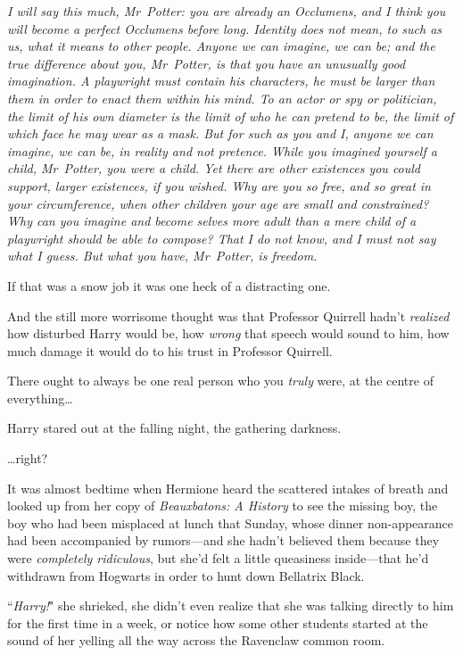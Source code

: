 \emph{I will say this much, Mr~Potter: you are already an Occlumens, and I think you will become a perfect Occlumens before long. Identity does not mean, to such as us, what it means to other people. Anyone we can imagine, we can be; and the true difference about you, Mr~Potter, is that you have an unusually good imagination. A playwright must contain his characters, he must be larger than them in order to enact them within his mind. To an actor or spy or politician, the limit of his own diameter is the limit of who he can pretend to be, the limit of which face he may wear as a mask. But for such as you and I, anyone we can imagine, we can \emph{be}, in reality and not pretence. While you imagined yourself a child, Mr~Potter, you \emph{were} a child. Yet there are other existences you could support, larger existences, if you wished. Why are you so free, and so great in your circumference, when other children your age are small and constrained? Why can you imagine and \emph{become} selves more adult than a mere child of a playwright should be able to compose? That I do not know, and I must not say what I guess. But what you have, Mr~Potter, is freedom.}

If that was a snow job it was one heck of a distracting one.

And the still more worrisome thought was that Professor Quirrell hadn't \emph{realized} how disturbed Harry would be, how \emph{wrong} that speech would sound to him, how much damage it would do to his trust in Professor Quirrell.

There ought to always be one real person who you \emph{truly} were, at the centre of everything{\ldots}

Harry stared out at the falling night, the gathering darkness.

{\ldots}right?

\later

It was almost bedtime when Hermione heard the scattered intakes of breath and looked up from her copy of \emph{Beauxbatons: A History} to see the missing boy, the boy who had been misplaced at lunch that Sunday, whose dinner non-appearance had been accompanied by rumors—and she hadn't believed them because they were \emph{completely ridiculous}, but she'd felt a little queasiness inside—that he'd withdrawn from Hogwarts in order to hunt down Bellatrix Black.

``\emph{Harry!}" she shrieked, she didn't even realize that she was talking directly to him for the first time in a week, or notice how some other students started at the sound of her yelling all the way across the Ravenclaw common room.

